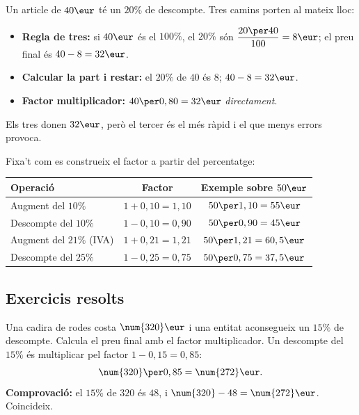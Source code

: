 \begin{exemple}
Un article de $40\eur$ té un $20\%$ de descompte. Tres camins porten al mateix lloc:
\begin{itemize}[leftmargin=1.4em, itemsep=2pt]
  \item \textbf{Regla de tres:} si $40\eur$ és el $100\%$, el $20\%$ són
        $\dfrac{20\per 40}{100}=8\eur$; el preu final és $40-8=32\eur$.
  \item \textbf{Calcular la part i restar:} el $20\%$ de $40$ és $8$; $40-8=32\eur$.
  \item \textbf{Factor multiplicador:} $40\per 0,80=32\eur$ \emph{directament}.
\end{itemize}
Els tres donen $32\eur$, però el tercer és el més ràpid i el que menys errors provoca.
\end{exemple}

\begin{exemple}
Fixa't com es construeix el factor a partir del percentatge:
\begin{center}
\renewcommand{\arraystretch}{1.3}
\begin{tabular}{l c c}
\toprule
\textbf{Operació} & \textbf{Factor} & \textbf{Exemple sobre $50\eur$} \\
\midrule
Augment del $10\%$ & $1+0,10=1,10$ & $50\per 1,10=55\eur$ \\
Descompte del $10\%$ & $1-0,10=0,90$ & $50\per 0,90=45\eur$ \\
Augment del $21\%$ (IVA) & $1+0,21=1,21$ & $50\per 1,21=60,5\eur$ \\
Descompte del $25\%$ & $1-0,25=0,75$ & $50\per 0,75=37,5\eur$ \\
\bottomrule
\end{tabular}
\end{center}
\end{exemple}

\subsection{Exercicis resolts}

\begin{exresolt}
Una cadira de rodes costa $\num{320}\eur$ i una entitat aconsegueix un $15\%$ de
descompte. Calcula el preu final amb el factor multiplicador.
\solucio
Un descompte del $15\%$ és multiplicar pel factor $1-0,15=0,85$:
\[
\num{320}\per 0,85=\num{272}\eur.
\]
\textbf{Comprovació:} el $15\%$ de $\num{320}$ és $48$, i $\num{320}-48=\num{272}\eur$.
Coincideix.
\end{exresolt}

